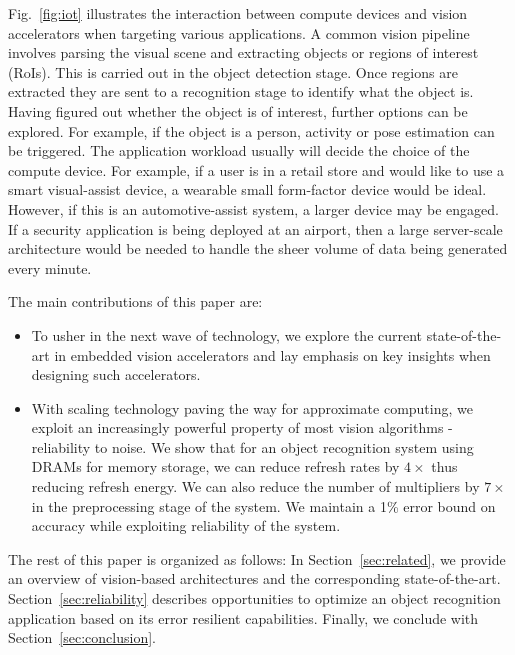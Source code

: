 Fig.~\ref{fig:iot} illustrates the interaction between compute devices and vision accelerators when targeting various applications. A common vision pipeline involves parsing the visual scene and extracting objects or regions of interest (RoIs). This is 
carried out in the object detection stage. Once regions are extracted they are sent to a recognition stage to identify 
what the object is. Having figured out whether the object is of interest, further options can be explored. For example, if the 
object is a person, activity or pose estimation can be triggered. The application workload usually will decide the choice of 
the compute device. For example, if a user is in a retail store and would like to use a smart visual-assist device, a 
wearable small form-factor device would be ideal. However, if this is an automotive-assist system, a larger device may be 
engaged. If a security application is being deployed at an airport, then a large server-scale architecture would be needed to
handle the sheer volume of data being generated every minute.

The main contributions of this paper are:
\begin{itemize}
\item To usher in the next wave of technology, we explore the current state-of-the-art in 
embedded vision accelerators and lay emphasis on key insights when designing such accelerators.
\item With scaling technology paving the way for approximate computing, we exploit an increasingly powerful property of most vision algorithms - reliability to noise. 
We show that for an object recognition system using DRAMs for memory storage, we can reduce refresh rates by $4\times$ thus reducing refresh energy. We can also reduce the number of multipliers by $7\times$ in the preprocessing stage of the system. We maintain a 1\% error bound on accuracy while exploiting reliability of the system.
\end{itemize}

The rest of this paper is organized as follows:
In Section~\ref{sec:related}, we provide an overview of vision-based architectures and the corresponding state-of-the-art.
Section~\ref{sec:reliability} describes opportunities to optimize an object recognition application based on its error resilient capabilities.
Finally, we conclude with Section~\ref{sec:conclusion}.
